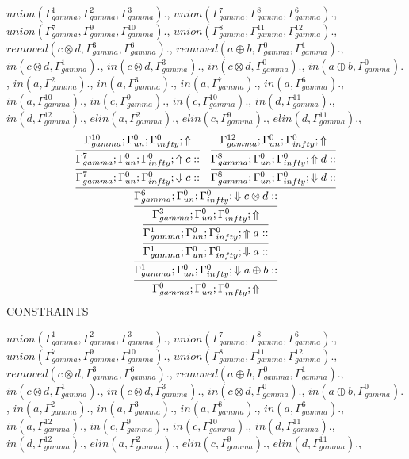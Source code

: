 \documentclass[a4paper, 11pt]{article}
\begin{document}
$union(\Gamma_{gamma}^{1}, \Gamma_{gamma}^{2}, \Gamma_{gamma}^{3}).$, $union(\Gamma_{gamma}^{7}, \Gamma_{gamma}^{8}, \Gamma_{gamma}^{6}).$, $union(\Gamma_{gamma}^{7}, \Gamma_{gamma}^{9}, \Gamma_{gamma}^{10}).$, $union(\Gamma_{gamma}^{8}, \Gamma_{gamma}^{11}, \Gamma_{gamma}^{12}).$, $removed(c \otimes d, \Gamma_{gamma}^{3}, \Gamma_{gamma}^{6}).$, $removed(a \oplus b, \Gamma_{gamma}^{0}, \Gamma_{gamma}^{1}).$, $in(c \otimes d, \Gamma_{gamma}^{1}).$, $in(c \otimes d, \Gamma_{gamma}^{3}).$, $in(c \otimes d, \Gamma_{gamma}^{0}).$, $in(a \oplus b, \Gamma_{gamma}^{0}).$, $in(a, \Gamma_{gamma}^{2}).$, $in(a, \Gamma_{gamma}^{3}).$, $in(a, \Gamma_{gamma}^{7}).$, $in(a, \Gamma_{gamma}^{6}).$, $in(a, \Gamma_{gamma}^{10}).$, $in(c, \Gamma_{gamma}^{9}).$, $in(c, \Gamma_{gamma}^{10}).$, $in(d, \Gamma_{gamma}^{11}).$, $in(d, \Gamma_{gamma}^{12}).$, $elin(a, \Gamma_{gamma}^{2}).$, $elin(c, \Gamma_{gamma}^{9}).$, $elin(d, \Gamma_{gamma}^{11}).$, 
{\small
\[
\infer{\Gamma_{ gamma}^{0} ; \Gamma_{un}^{0} ; \Gamma_{ infty}^{0} ;  \Uparrow }
{\infer{\Gamma_{ gamma}^{1} ; \Gamma_{un}^{0} ; \Gamma_{ infty}^{0} ;  \Downarrow a \oplus b :: }
{\infer{\Gamma_{ gamma}^{1} ; \Gamma_{un}^{0} ; \Gamma_{ infty}^{0} ;  \Downarrow a :: }
{\infer{\Gamma_{ gamma}^{1} ; \Gamma_{un}^{0} ; \Gamma_{ infty}^{0} ;  \Uparrow a :: }
{\infer{\Gamma_{ gamma}^{3} ; \Gamma_{un}^{0} ; \Gamma_{ infty}^{0} ;  \Uparrow }
{\infer{\Gamma_{ gamma}^{6} ; \Gamma_{un}^{0} ; \Gamma_{ infty}^{0} ;  \Downarrow c \otimes d :: }
{\infer{\Gamma_{ gamma}^{7} ; \Gamma_{un}^{0} ; \Gamma_{ infty}^{0} ;  \Downarrow c :: }
{\infer{\Gamma_{ gamma}^{7} ; \Gamma_{un}^{0} ; \Gamma_{ infty}^{0} ;  \Uparrow c :: }
{\Gamma_{ gamma}^{10} ; \Gamma_{un}^{0} ; \Gamma_{ infty}^{0} ;  \Uparrow }}
&
\infer{\Gamma_{ gamma}^{8} ; \Gamma_{un}^{0} ; \Gamma_{ infty}^{0} ;  \Downarrow d :: }
{\infer{\Gamma_{ gamma}^{8} ; \Gamma_{un}^{0} ; \Gamma_{ infty}^{0} ;  \Uparrow d :: }
{\Gamma_{ gamma}^{12} ; \Gamma_{un}^{0} ; \Gamma_{ infty}^{0} ;  \Uparrow }}}}}}}}
\]
}
CONSTRAINTS

$union(\Gamma_{gamma}^{1}, \Gamma_{gamma}^{2}, \Gamma_{gamma}^{3}).$, $union(\Gamma_{gamma}^{7}, \Gamma_{gamma}^{8}, \Gamma_{gamma}^{6}).$, $union(\Gamma_{gamma}^{7}, \Gamma_{gamma}^{9}, \Gamma_{gamma}^{10}).$, $union(\Gamma_{gamma}^{8}, \Gamma_{gamma}^{11}, \Gamma_{gamma}^{12}).$, $removed(c \otimes d, \Gamma_{gamma}^{3}, \Gamma_{gamma}^{6}).$, $removed(a \oplus b, \Gamma_{gamma}^{0}, \Gamma_{gamma}^{1}).$, $in(c \otimes d, \Gamma_{gamma}^{1}).$, $in(c \otimes d, \Gamma_{gamma}^{3}).$, $in(c \otimes d, \Gamma_{gamma}^{0}).$, $in(a \oplus b, \Gamma_{gamma}^{0}).$, $in(a, \Gamma_{gamma}^{2}).$, $in(a, \Gamma_{gamma}^{3}).$, $in(a, \Gamma_{gamma}^{8}).$, $in(a, \Gamma_{gamma}^{6}).$, $in(a, \Gamma_{gamma}^{12}).$, $in(c, \Gamma_{gamma}^{9}).$, $in(c, \Gamma_{gamma}^{10}).$, $in(d, \Gamma_{gamma}^{11}).$, $in(d, \Gamma_{gamma}^{12}).$, $elin(a, \Gamma_{gamma}^{2}).$, $elin(c, \Gamma_{gamma}^{9}).$, $elin(d, \Gamma_{gamma}^{11}).$, 
\end{document}
